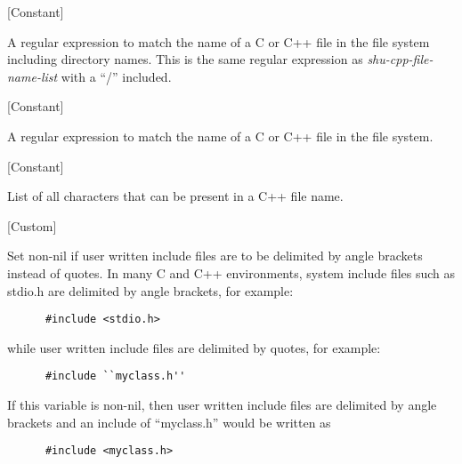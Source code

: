 \vspace{1em}
\noindent
{}
\usebox{\funcname}
 \hfill [Constant]

\begin{doc-string}
A regular expression to match the name of a C or C++ file in the file system
including directory names.  This is the same regular expression as
\emph{shu-cpp-file-name-list} with a ``/'' included.
\end{doc-string}

\vspace{1em}
\noindent
{}
\usebox{\funcname}
 \hfill [Constant]

\begin{doc-string}
A regular expression to match the name of a C or C++ file in the file system.
\end{doc-string}

\vspace{1em}
\noindent
{}
\usebox{\funcname}
 \hfill [Constant]

\begin{doc-string}
List of all characters that can be present in a C++ file name.
\end{doc-string}

\vspace{1em}
\noindent
{}
\usebox{\funcname}
 \hfill [Custom]

\begin{doc-string}
Set non-nil if user written include files are to be delimited by
angle brackets instead of quotes.
In many C and C++ environments, system include files such as stdio.h are delimited
by angle brackets, for example:

\small{\begin{verbatim}
      #include <stdio.h>
\end{verbatim}}

while user written include files are delimited by quotes, for example:

\small{\begin{verbatim}
      #include ``myclass.h''
\end{verbatim}}

If this variable is non-nil, then user written include files are delimited
by angle brackets and an include of ``myclass.h'' would be written as

\small{\begin{verbatim}
      #include <myclass.h>
\end{verbatim}}
\end{doc-string}

